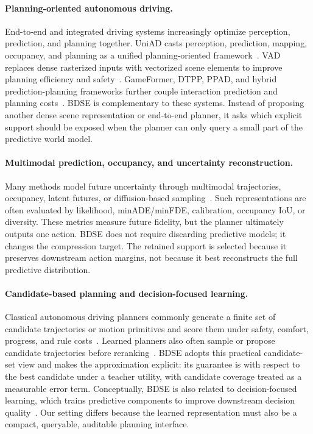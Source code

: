 \documentclass{article}
\begin{document}
\paragraph{Planning-oriented autonomous driving.}
End-to-end and integrated driving systems increasingly optimize perception, prediction, and planning together. UniAD casts perception, prediction, mapping, occupancy, and planning as a unified planning-oriented framework~\cite{hu2023uniad}. VAD replaces dense rasterized inputs with vectorized scene elements to improve planning efficiency and safety~\cite{jiang2023vad}. GameFormer, DTPP, PPAD, and hybrid prediction-planning frameworks further couple interaction prediction and planning costs~\cite{huang2023gameformer,huang2024dtpp,chen2024ppad,liu2025hybrid}. BDSE is complementary to these systems. Instead of proposing another dense scene representation or end-to-end planner, it asks which explicit support should be exposed when the planner can only query a small part of the predictive world model.

\paragraph{Multimodal prediction, occupancy, and uncertainty reconstruction.}
Many methods model future uncertainty through multimodal trajectories, occupancy, latent futures, or diffusion-based sampling~\cite{janner2022planning,zheng2025diffusion,zhong2025coplanner,shao2024uncertainty,nair2024predictive,michelmore2018evaluating}. Such representations are often evaluated by likelihood, minADE/minFDE, calibration, occupancy IoU, or diversity. These metrics measure future fidelity, but the planner ultimately outputs one action. BDSE does not require discarding predictive models; it changes the compression target. The retained support is selected because it preserves downstream action margins, not because it best reconstructs the full predictive distribution.

\paragraph{Candidate-based planning and decision-focused learning.}
Classical autonomous driving planners commonly generate a finite set of candidate trajectories or motion primitives and score them under safety, comfort, progress, and rule costs~\cite{mcnaughton2011conformal,pivtoraiko2009differentially,zhou2021spatiotemporal}. Learned planners also often sample or propose candidate trajectories before reranking~\cite{bansal2019chauffeurnet,jiang2023vad}. BDSE adopts this practical candidate-set view and makes the approximation explicit: its guarantee is with respect to the best candidate under a teacher utility, with candidate coverage treated as a measurable error term. Conceptually, BDSE is also related to decision-focused learning, which trains predictive components to improve downstream decision quality~\cite{mandi2023decisionfocused}. Our setting differs because the learned representation must also be a compact, queryable, auditable planning interface.
\end{document}
